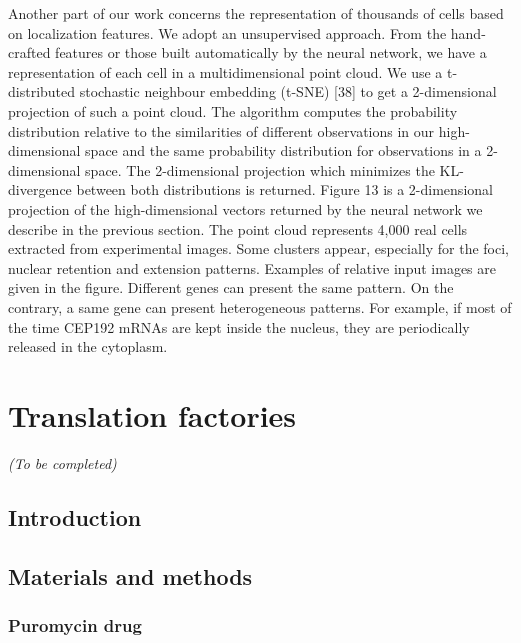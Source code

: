 Another part of our work concerns the representation of thousands of cells
based on localization features. We adopt an unsupervised approach. From the
hand-crafted features or those built automatically by the neural network, we
have a representation of each cell in a multidimensional point cloud. We use
a t-distributed stochastic neighbour embedding (t-SNE) [38] to get a 2-dimensional
projection of such a point cloud. The algorithm computes the probability distribution
relative to the similarities of different observations in our high-dimensional
space and the same probability distribution for observations in a 2-dimensional
space. The 2-dimensional projection which minimizes the KL-divergence between
both distributions is returned. Figure 13 is a 2-dimensional projection of the
high-dimensional vectors returned by the neural network we describe in the
previous section. The point cloud represents 4,000 real cells extracted from
experimental images. Some clusters appear, especially for the foci, nuclear
retention and extension patterns. Examples of relative input images are given
in the figure. Different genes can present the same pattern. On the contrary,
a same gene can present heterogeneous patterns. For example, if most of the
time CEP192 mRNAs are kept inside the nucleus, they are periodically released
in the cytoplasm.

\section{Translation factories}
\label{sec:translation_factories}

\begin{center}
	\textit{(To be completed)}
\end{center}

\subsection{Introduction}
\label{subsec:introduction_translation_factories}

\subsection{Materials and methods}
\label{subsec:materials_translation_factories}

\subsubsection{Puromycin drug}


